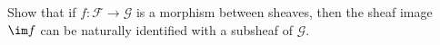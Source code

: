 Show that if $f\colon \mathcal{F}\to \mathcal{G}$ is a morphism between sheaves,
then the sheaf image $\im f$ can be naturally identified with a subsheaf of
$\mathcal{G}$.
